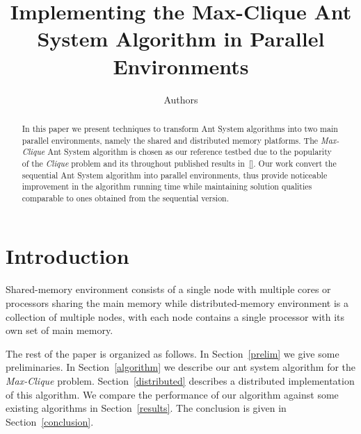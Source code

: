 \documentclass[11pt]{article}
\begin{document}
  

\title{Implementing the Max-Clique Ant System Algorithm in Parallel Environments} 
\author{ 
Authors\\ 
}  
\maketitle  


\begin{abstract}
In this paper we present techniques to transform Ant System algorithms into two main parallel environments, namely the shared and distributed memory platforms. The \textit{Max-Clique} Ant System algorithm is chosen as our reference testbed due to the popularity of the \textit{Clique} problem and its throughout published results in~\ref{}. Our work convert the sequential Ant System algorithm into parallel environments, thus provide noticeable improvement in the algorithm running time while maintaining solution qualities comparable to ones obtained from the sequential version.
\end{abstract}


\section{Introduction}\label{intro}

Shared-memory environment consists of a single node with multiple cores or processors sharing 
the main memory 
while distributed-memory environment is a collection of multiple nodes, with each node 
contains a single processor with its own set of main memory. %

The rest of the paper is organized as follows.  In Section~\ref{prelim} we
give some preliminaries.  In Section~\ref{algorithm} we describe our ant
system algorithm for the \textit{Max-Clique} problem.  Section~\ref{distributed}
describes a distributed implementation of this algorithm.  We compare the
performance of our algorithm against some existing algorithms in
Section~\ref{results}.  The conclusion is given in Section~\ref{conclusion}.
\end{document}
